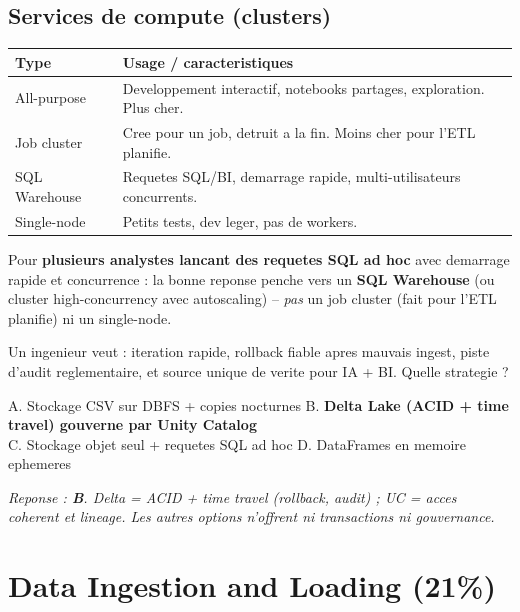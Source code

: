 \documentclass[11pt,a4paper]{article}
\begin{document}
\subsection{Services de compute (clusters)}

\begin{center}
\renewcommand{\arraystretch}{1.3}
\begin{tabular}{@{}p{3.5cm}p{11cm}@{}}
\toprule
\textbf{Type} & \textbf{Usage / caracteristiques} \\
\midrule
All-purpose & Developpement interactif, notebooks partages, exploration. Plus cher. \\
Job cluster & Cree pour un job, detruit a la fin. Moins cher pour l'ETL planifie. \\
SQL Warehouse & Requetes SQL/BI, demarrage rapide, multi-utilisateurs concurrents. \\
Single-node & Petits tests, dev leger, pas de workers. \\
\bottomrule
\end{tabular}
\end{center}

\begin{piege}
Pour \textbf{plusieurs analystes lancant des requetes SQL ad hoc} avec demarrage rapide et
concurrence : la bonne reponse penche vers un \textbf{SQL Warehouse} (ou cluster high-concurrency
avec autoscaling) -- \emph{pas} un job cluster (fait pour l'ETL planifie) ni un single-node.
\end{piege}

\begin{qcm}
Un ingenieur veut : iteration rapide, rollback fiable apres mauvais ingest, piste d'audit
reglementaire, et source unique de verite pour IA + BI. Quelle strategie ?

\smallskip
A. Stockage CSV sur DBFS + copies nocturnes \hfill
B. \textbf{Delta Lake (ACID + time travel) gouverne par Unity Catalog} \\
C. Stockage objet seul + requetes SQL ad hoc \hfill
D. DataFrames en memoire ephemeres

\smallskip
\textit{Reponse : \textbf{B}. Delta = ACID + time travel (rollback, audit) ; UC = acces
coherent et lineage. Les autres options n'offrent ni transactions ni gouvernance.}
\end{qcm}

\section{Data Ingestion and Loading (21\%)}
\end{document}
